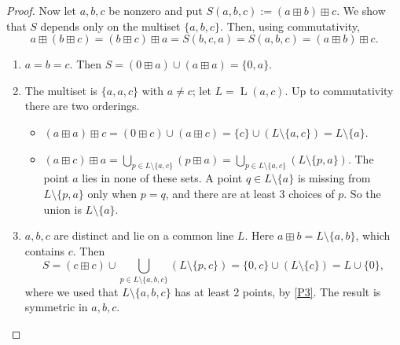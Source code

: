 \documentclass[11pt]{article}
\theoremstyle{definition}
\theoremstyle{remark}
\newcommand{\bp}{\boxplus}
\DeclareMathOperator{\Ln}{L}
\begin{document}
\begin{proof}
Now let $a,b,c$ be nonzero and put $S(a,b,c):=(a\bp b)\bp c$. We show that $S$ depends only on the multiset $\{a,b,c\}$. Then, using commutativity,
\[
a\bp(b\bp c)=(b\bp c)\bp a=S(b,c,a)=S(a,b,c)=(a\bp b)\bp c.
\]
\begin{enumerate}[label=\textup{Case \arabic*.},ref=\arabic*,leftmargin=*]
\item\label{case1} $a=b=c$. Then $S=(0\bp a)\cup(a\bp a)=\{0,a\}$.

\item\label{case2} The multiset is $\{a,a,c\}$ with $a\neq c$; let $L=\Ln(a,c)$. Up to commutativity there are two orderings.
\begin{itemize}[nosep]
\item $(a\bp a)\bp c=(0\bp c)\cup(a\bp c)=\{c\}\cup(L\setminus\{a,c\})=L\setminus\{a\}$.
\item $(a\bp c)\bp a=\bigcup_{p\in L\setminus\{a,c\}}(p\bp a)=\bigcup_{p\in L\setminus\{a,c\}}(L\setminus\{p,a\})$. The point $a$ lies in none of these sets. A point $q\in L\setminus\{a\}$ is missing from $L\setminus\{p,a\}$ only when $p=q$, and there are at least $3$ choices of $p$. So the union is $L\setminus\{a\}$.
\end{itemize}

\item\label{case3} $a,b,c$ are distinct and lie on a common line $L$. Here $a\bp b=L\setminus\{a,b\}$, which contains $c$. Then
\[
S=(c\bp c)\cup\bigcup_{p\in L\setminus\{a,b,c\}}(L\setminus\{p,c\})=\{0,c\}\cup(L\setminus\{c\})=L\cup\{0\},
\]
where we used that $L\setminus\{a,b,c\}$ has at least $2$ points, by \ref{P3}. The result is symmetric in $a,b,c$.


\end{enumerate}
\end{proof}
\end{document}
